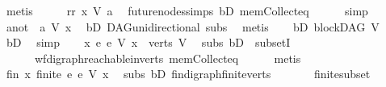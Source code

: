 \begin{isabellebody}
\ metis\isanewline
\ \ \isamarkupfalse%
\ \isamarkupfalse%
\ rr{\isacharcolon}{\kern0pt}\ {\isachardoublequoteopen}x\ {\isasymrightarrow}\isactrlsup {\isacharplus}{\kern0pt}\isactrlbsub V\isactrlesub \ a{\isachardoublequoteclose}\ \isamarkupfalse%
\ future{\isacharunderscore}{\kern0pt}nodes{\isachardot}{\kern0pt}simps\ bD\ mem{\isacharunderscore}{\kern0pt}Collect{\isacharunderscore}{\kern0pt}eq\isanewline
\ \ \ \ \isamarkupfalse%
\ simp\ \ \isanewline
\ \ \isamarkupfalse%
\ \isamarkupfalse%
\ a{\isacharunderscore}{\kern0pt}not{\isacharcolon}{\kern0pt}\ {\isachardoublequoteopen}{\isasymnot}\ a\ {\isasymrightarrow}\isactrlsup {\isacharasterisk}{\kern0pt}\isactrlbsub V\isactrlesub \ x{\isachardoublequoteclose}\ \isamarkupfalse%
\ bD\ DAG{\isachardot}{\kern0pt}unidirectional\ subs\ \isamarkupfalse%
\ metis\isanewline
\ \ \isamarkupfalse%
\ bD{}{\isacharcolon}{\kern0pt}\ {\isachardoublequoteopen}blockDAG\ V{\isachardoublequoteclose}\ \isamarkupfalse%
\ bD\ \isamarkupfalse%
\ simp\isanewline
\ \ \isamarkupfalse%
\ {\isachardoublequoteopen}{\isasymforall}x{\isachardot}{\kern0pt}\ {\isacharbraceleft}{\kern0pt}e{\isachardot}{\kern0pt}\ e\ {\isasymrightarrow}\isactrlsup {\isacharasterisk}{\kern0pt}\isactrlbsub V\isactrlesub \ x{\isacharbraceright}{\kern0pt}\ {\isasymsubseteq}\ verts\ V{\isachardoublequoteclose}\ \isamarkupfalse%
\ subs\ bD{}\ \ subsetI\isanewline
\ \ \ \ \ \ wf{\isacharunderscore}{\kern0pt}digraph{\isachardot}{\kern0pt}reachable{\isacharunderscore}{\kern0pt}in{\isacharunderscore}{\kern0pt}verts{\isacharparenleft}{\kern0pt}{}{\isacharparenright}{\kern0pt}\ mem{\isacharunderscore}{\kern0pt}Collect{\isacharunderscore}{\kern0pt}eq\isanewline
\ \ \ \ \isamarkupfalse%
\ metis\ \isanewline
\ \ \isamarkupfalse%
\ \isamarkupfalse%
\ fin{\isacharcolon}{\kern0pt}\ {\isachardoublequoteopen}{\isasymforall}x{\isachardot}{\kern0pt}\ finite\ {\isacharbraceleft}{\kern0pt}e{\isachardot}{\kern0pt}\ e\ {\isasymrightarrow}\isactrlsup {\isacharasterisk}{\kern0pt}\isactrlbsub V\isactrlesub \ x{\isacharbraceright}{\kern0pt}{\isachardoublequoteclose}\ \isamarkupfalse%
\ subs\ bD{}\ fin{\isacharunderscore}{\kern0pt}digraph{\isachardot}{\kern0pt}finite{\isacharunderscore}{\kern0pt}verts\ \isanewline
\ \ \ \ \ \ finite{\isacharunderscore}{\kern0pt}subset\isanewline

\end{isabellebody}

